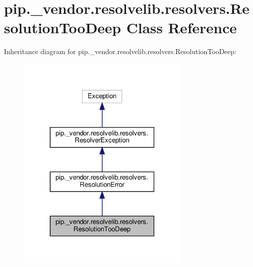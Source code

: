 \hypertarget{classpip_1_1__vendor_1_1resolvelib_1_1resolvers_1_1ResolutionTooDeep}{}\section{pip.\+\_\+vendor.\+resolvelib.\+resolvers.\+Resolution\+Too\+Deep Class Reference}
\label{classpip_1_1__vendor_1_1resolvelib_1_1resolvers_1_1ResolutionTooDeep}


Inheritance diagram for pip.\+\_\+vendor.\+resolvelib.\+resolvers.\+Resolution\+Too\+Deep\+:
\nopagebreak
\begin{figure}[H]
\begin{center}
\leavevmode
\includegraphics[width=237pt]{classpip_1_1__vendor_1_1resolvelib_1_1resolvers_1_1ResolutionTooDeep__inherit__graph}
\end{center}
\end{figure}


